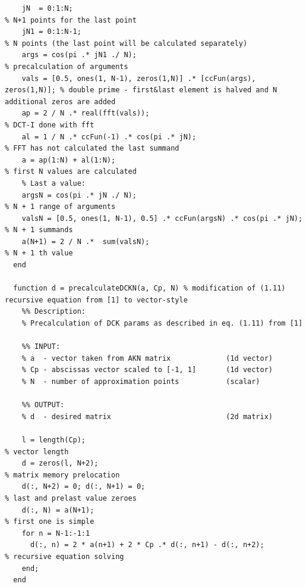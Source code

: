 \documentclass[12pt,twoside,a4paper]{article}
\numberwithin{equation}{subsection}
\numberwithin{figure}{subsection}
\begin{document}
\begin{lstlisting}
    jN  = 0:1:N;                                                         % N+1 points for the last point
    jN1 = 0:1:N-1;                                                       % N points (the last point will be calculated separately)
    args = cos(pi .* jN1 ./ N);                                          % precalculation of arguments
    vals = [0.5, ones(1, N-1), zeros(1,N)] .* [ccFun(args), zeros(1,N)]; % double prime - first&last element is halved and N additional zeros are added
    ap = 2 / N .* real(fft(vals));                                       % DCT-I done with fft
    al = 1 / N .* ccFun(-1) .* cos(pi .* jN);                            % FFT has not calculated the last summand
    a = ap(1:N) + al(1:N);                                               % first N values are calculated
    % Last a value:
    argsN = cos(pi .* jN ./ N);                                          % N + 1 range of arguments
    valsN = [0.5, ones(1, N-1), 0.5] .* ccFun(argsN) .* cos(pi .* jN);   % N + 1 summands
    a(N+1) = 2 / N .*  sum(valsN);                                       % N + 1 th value
  end

  function d = precalculateDCKN(a, Cp, N) % modification of (1.11) recursive equation from [1] to vector-style
    %% Description:
    % Precalculation of DCK params as described in eq. (1.11) from [1] 

    %% INPUT:
    % a  - vector taken from AKN matrix             (1d vector)
    % Cp - abscissas vector scaled to [-1, 1]       (1d vector)
    % N  - number of approximation points           (scalar)

    %% OUTPUT:
    % d  - desired matrix                           (2d matrix)

    l = length(Cp);                                                   % vector length
    d = zeros(l, N+2);                                                % matrix memory prelocation
    d(:, N+2) = 0; d(:, N+1) = 0;                                     % last and prelast value zeroes
    d(:, N) = a(N+1);                                                 % first one is simple
    for n = N-1:-1:1 
      d(:, n) = 2 * a(n+1) + 2 * Cp .* d(:, n+1) - d(:, n+2);         % recursive equation solving 
    end; 
  end
\end{lstlisting}
\end{document}
